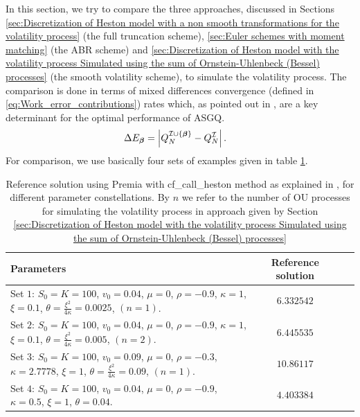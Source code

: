 \documentclass[11pt]{article}
\begin{document}
In this section, we try to compare  the three approaches, discussed  in Sections  \ref{sec:Discretization of Heston model with a non smooth transformations for the volatility process} (the full truncation scheme), \ref{sec:Euler schemes with moment matching} (the ABR scheme)  and \ref{sec:Discretization of Heston model with the volatility process Simulated using the sum of  Ornstein-Uhlenbeck (Bessel) processes} (the smooth volatility scheme), to simulate the volatility process. The comparison is done in terms of mixed differences convergence (defined in \eqref{eq:Work_error_contributions}) rates  which, as pointed out in \cite{haji2016multi}, are a key determinant for the optimal performance of ASGQ.
\begin{align}\label{eq:Work_error_contributions}
\Delta E_{\boldsymbol{\beta}} &= \left\lvert Q^{\mathcal{I} \cup \{\boldsymbol{\beta}\}}_N-Q^{\mathcal{I}}_N\right\rvert.
\end{align}
For comparison, we use basically four  sets of examples  given in table \ref{table:Reference solution, for different parameter constellations.}.

\FloatBarrier
\begin{table}[!h]
	\centering
	\begin{small}
	\begin{tabular}{l*{2}{c}r}
	\toprule[1.5pt]
		Parameters            & Reference solution    \\
		\hline

			Set $1$:	 $S_0=K=100$, $v_0=0.04$, $\mu=0$,  $\rho=-0.9$, $\kappa=1$, $\xi=0.1$, $\theta=\frac{\xi^2}{4 \kappa}=0.0025$, $(n=1)$.  & $6.332542$  \\	
				Set $2$: $S_0=K=100$, $v_0=0.04$, $\mu=0$,  $\rho=-0.9$, $\kappa=1$, $\xi=0.1$, $\theta=\frac{\xi^2}{4 \kappa}=0.005$, $(n=2)$.  & $6.445535$  \\	
					Set $3$:	$S_0=K=100$, $v_0=0.09$, $\mu=0$,  $\rho=-0.3$, $\kappa=2.7778$, $\xi=1$, $\theta=\frac{\xi^2}{4 \kappa}=0.09$, $(n=1)$.  & $10.86117$   \\
						Set $4$:	$S_0=K=100$, $v_0=0.04$, $\mu=0$,  $\rho=-0.9$, $\kappa=0.5$, $\xi=1$, $\theta=0.04$.  & $4.403384$\\
	\bottomrule[1.25pt]
	\end{tabular}
\end{small}
	\caption{Reference solution using Premia with cf\_call\_heston method as explained in \cite{heston1993closed}, for different parameter constellations. By $n$ we refer to the number of OU processes for simulating the volatility process in approach given by Section \ref{sec:Discretization of Heston model with the volatility process Simulated using the sum of  Ornstein-Uhlenbeck (Bessel) processes}}
	\label{table:Reference solution, for different parameter constellations.}
\end{table}
\FloatBarrier
\end{document}
